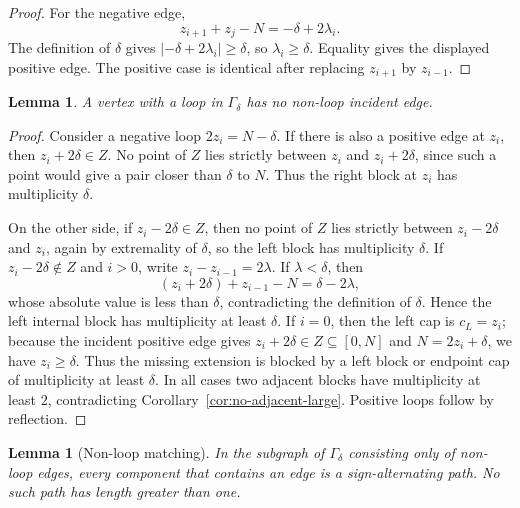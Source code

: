 \documentclass[11pt]{article}
\newtheorem{lemma}[theorem]{Lemma}
\begin{document}
\begin{proof}
For the negative edge,
\[
        z_{i+1}+z_j-N=-\delta+2\lambda_i.
\]
The definition of $\delta$ gives $|-\delta+2\lambda_i|\ge\delta$, so $\lambda_i\ge\delta$.  Equality gives the displayed positive edge.  The positive case is identical after replacing $z_{i+1}$ by $z_{i-1}$.
\end{proof}




\begin{lemma}\label{lem:isolated-loop}
A vertex with a loop in $\Gamma_\delta$ has no non-loop incident edge.
\end{lemma}

\begin{proof}
Consider a negative loop $2z_i=N-\delta$.  If there is also a positive edge at $z_i$, then $z_i+2\delta\in Z$.  No point of $Z$ lies strictly between $z_i$ and $z_i+2\delta$, since such a point would give a pair closer than $\delta$ to $N$.  Thus the right block at $z_i$ has multiplicity $\delta$.

On the other side, if $z_i-2\delta\in Z$, then no point of $Z$ lies strictly between $z_i-2\delta$ and $z_i$, again by extremality of $\delta$, so the left block has multiplicity $\delta$.  If $z_i-2\delta\notin Z$ and $i>0$, write $z_i-z_{i-1}=2\lambda$.  If $\lambda<\delta$, then
\[
        (z_i+2\delta)+z_{i-1}-N
        =\delta-2\lambda,
\]
whose absolute value is less than $\delta$, contradicting the definition of $\delta$.  Hence the left internal block has multiplicity at least $\delta$.  If $i=0$, then the left cap is $c_L=z_i$; because the incident positive edge gives $z_i+2\delta\in Z\subseteq[0,N]$ and $N=2z_i+\delta$, we have $z_i\ge\delta$.  Thus the missing extension is blocked by a left block or endpoint cap of multiplicity at least $\delta$.  In all cases two adjacent blocks have multiplicity at least $2$, contradicting Corollary~\ref{cor:no-adjacent-large}.  Positive loops follow by reflection.
\end{proof}

\begin{lemma}[Non-loop matching]\label{lem:degree-path}
In the subgraph of $\Gamma_\delta$ consisting only of non-loop edges, every component that contains an edge is a sign-alternating path.  No such path has length greater than one.
\end{lemma}
\end{document}
